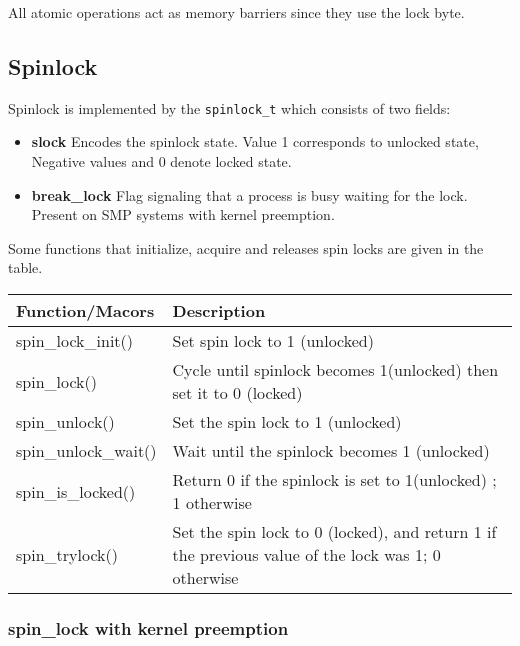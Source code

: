 \documentclass{article}
\begin{document}
All atomic operations act as memory barriers since they use the lock
byte.


\subsection{Spinlock}

Spinlock is implemented by the \lstinline{spinlock_t} which consists
of two fields:

\begin{itemize}
  \item \textbf{slock} Encodes the spinlock state. Value 1 corresponds
    to unlocked state, Negative values and 0 denote locked state.
  
  \item \textbf{break\_lock} Flag signaling that a process is busy
    waiting for the lock. Present on SMP systems with kernel
    preemption.    
\end{itemize}

Some functions that initialize, acquire and releases spin locks are
given in the table.

  \begin{center}
  \begin{tabular}{ |l | p{7cm}| }    
    \hline
    Function/Macors & Description \\ \hline
    spin\_lock\_init() & Set spin lock to 1 (unlocked) \\
    \hline
    spin\_lock() &
    Cycle until spinlock becomes 1(unlocked) then set it to 0 (locked) \\
    \hline
    spin\_unlock() & Set the spin lock to 1 (unlocked) \\
    \hline
    spin\_unlock\_wait() & Wait until the spinlock becomes 1 (unlocked)  \\
    \hline
    spin\_is\_locked() & Return 0 if the spinlock is set to 1(unlocked) ; 1 otherwise  \\
    \hline
    spin\_trylock() &  Set the spin lock to 0 (locked), and return 1 if the previous value of the lock was 1; 0 otherwise\\
    \hline
  \end{tabular}
  \end{center}

  \subsubsection{spin\_lock with kernel preemption}
\end{document}
